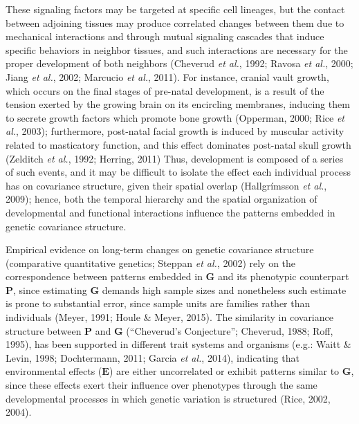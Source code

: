 \documentclass[12pt,twoside]{report}
\begin{document}
These signaling factors may be targeted at specific cell lineages, but
the contact between adjoining tissues may produce correlated changes
between them due to mechanical interactions and through mutual signaling
cascades that induce specific behaviors in neighbor tissues, and such
interactions are necessary for the proper development of both neighbors
(Cheverud \emph{et al.}, 1992; Ravosa \emph{et al.}, 2000; Jiang
\emph{et al.}, 2002; Marcucio \emph{et al.}, 2011). For instance,
cranial vault growth, which occurs on the final stages of pre-natal
development, is a result of the tension exerted by the growing brain on
its encircling membranes, inducing them to secrete growth factors which
promote bone growth (Opperman, 2000; Rice \emph{et al.}, 2003);
furthermore, post-natal facial growth is induced by muscular activity
related to masticatory function, and this effect dominates post-natal
skull growth (Zelditch \emph{et al.}, 1992; Herring, 2011) Thus,
development is composed of a series of such events, and it may be
difficult to isolate the effect each individual process has on
covariance structure, given their spatial overlap (Hallgrímsson \emph{et
al.}, 2009); hence, both the temporal hierarchy and the spatial
organization of developmental and functional interactions influence the
patterns embedded in genetic covariance structure.

Empirical evidence on long-term changes on genetic covariance structure
(comparative quantitative genetics; Steppan \emph{et al.}, 2002) rely on
the correspondence between patterns embedded in $\mathbf{G}$ and its
phenotypic counterpart $\mathbf{P}$, since estimating $\mathbf{G}$
demands high sample sizes and nonetheless such estimate is prone to
substantial error, since sample units are families rather than
individuals (Meyer, 1991; Houle \& Meyer, 2015). The similarity in
covariance structure between $\mathbf{P}$ and $\mathbf{G}$ (``Cheverud's
Conjecture''; Cheverud, 1988; Roff, 1995), has been supported in
different trait systems and organisms (e.g.: Waitt \& Levin, 1998;
Dochtermann, 2011; Garcia \emph{et al.}, 2014), indicating that
environmental effects ($\mathbf{E}$) are either uncorrelated or exhibit
patterns similar to $\mathbf{G}$, since these effects exert their
influence over phenotypes through the same developmental processes in
which genetic variation is structured (Rice, 2002, 2004).
\end{document}
